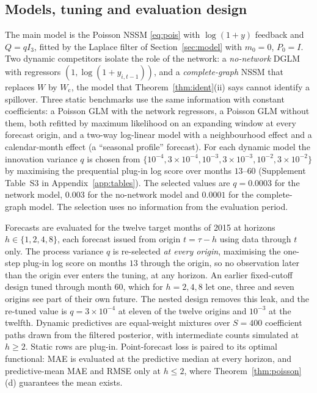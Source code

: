 \documentclass[12pt]{article}
\theoremstyle{plain}
\theoremstyle{definition}
\theoremstyle{remark}
\newcommand{\Wc}{W_{\mathrm{c}}}
\newcommand{\QNet}{0.0003}
\newcommand{\QNonet}{0.003}
\newcommand{\QComp}{0.0001}
\begin{document}
\subsection{Models, tuning and evaluation design}\label{sec:design}
The main model is the Poisson NSSM \eqref{eq:pois} with $\log(1+y)$ feedback and $Q=qI_3$, fitted by the Laplace filter of Section~\ref{sec:model} with $m_0=0$, $P_0=I$. Two dynamic competitors isolate the role of the network: a \emph{no-network} DGLM with regressors $(1,\log(1+y_{i,t-1}))$, and a \emph{complete-graph} NSSM that replaces $W$ by $\Wc$, the model that Theorem~\ref{thm:ident}(ii) says cannot identify a spillover. Three static benchmarks use the same information with constant coefficients: a Poisson GLM with the network regressors, a Poisson GLM without them, both refitted by maximum likelihood on an expanding window at every forecast origin, and a two-way log-linear model with a neighbourhood effect and a calendar-month effect (a ``seasonal profile'' forecast). For each dynamic model the innovation variance $q$ is chosen from $\{10^{-4},3\times10^{-4},10^{-3},3\times10^{-3},10^{-2},3\times10^{-2}\}$ by maximising the prequential plug-in log score over months $13$--$60$ (Supplement Table~S3 in Appendix~\ref{app:tables}). The selected values are $q=\QNet$ for the network model, $\QNonet$ for the no-network model and $\QComp$ for the complete-graph model. The selection uses no information from the evaluation period.

Forecasts are evaluated for the twelve target months of 2015 at horizons $h\in\{1,2,4,8\}$, each forecast issued from origin $t=\tau-h$ using data through $t$ only. The process variance $q$ is re-selected \emph{at every origin}, maximising the one-step plug-in log score on months $13$ through the origin, so no observation later than the origin ever enters the tuning, at any horizon. An earlier fixed-cutoff design tuned through month $60$, which for $h=2,4,8$ let one, three and seven origins see part of their own future. The nested design removes this leak, and the re-tuned value is $q=3\times10^{-4}$ at eleven of the twelve origins and $10^{-3}$ at the twelfth. Dynamic predictives are equal-weight mixtures over $S=400$ coefficient paths drawn from the filtered posterior, with intermediate counts simulated at $h\ge2$. Static rows are plug-in. Point-forecast loss is paired to its optimal functional: MAE is evaluated at the predictive median at every horizon, and predictive-mean MAE and RMSE only at $h\le2$, where Theorem~\ref{thm:poisson}(d) guarantees the mean exists.
\end{document}
